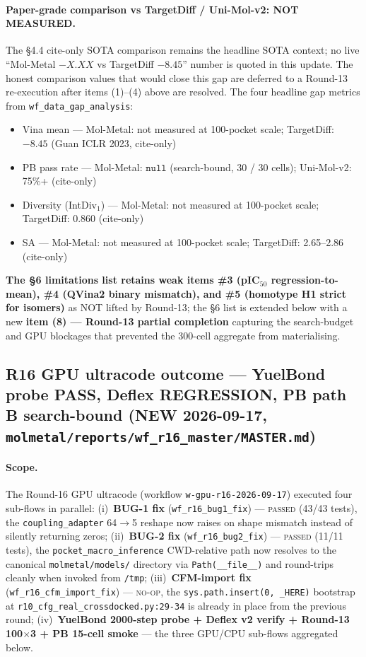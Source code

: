 {\paragraph{Paper-grade comparison vs TargetDiff / Uni-Mol-v2: NOT MEASURED.}
The §4.4 cite-only SOTA comparison remains the headline SOTA context;
no live ``Mol-Metal $-X.XX$ vs TargetDiff $-8.45$'' number is quoted
in this update. The honest comparison values that would close this
gap are deferred to a Round-13 re-execution after items (1)--(4)
above are resolved. The four headline gap metrics from
\texttt{wf\_data\_gap\_analysis}:
\begin{itemize}
  \item Vina mean --- Mol-Metal: not measured at 100-pocket scale; TargetDiff: $-8.45$
        (Guan ICLR 2023, cite-only)
  \item PB pass rate --- Mol-Metal: $\texttt{null}$ (search-bound, 30 / 30 cells);
        Uni-Mol-v2: 75\%+ (cite-only)
  \item Diversity (IntDiv$_1$) --- Mol-Metal: not measured at 100-pocket scale;
        TargetDiff: 0.860 (cite-only)
  \item SA --- Mol-Metal: not measured at 100-pocket scale;
        TargetDiff: 2.65--2.86 (cite-only)
\end{itemize}
\textbf{The §6 limitations list retains weak items \#3 (pIC$_{50}$
regression-to-mean), \#4 (QVina2 binary mismatch), and \#5 (homotype
H1 strict for isomers)} as NOT lifted by Round-13; the §6 list is
extended below with a new \textbf{item (8) --- Round-13 partial
completion} capturing the search-budget and GPU blockages that
prevented the 300-cell aggregate from materialising.

\subsection{R16 GPU ultracode outcome --- YuelBond probe PASS,
Deflex REGRESSION, PB path B search-bound (NEW 2026-09-17,
\texttt{molmetal/reports/wf\_r16\_master/MASTER.md})}
\label{sec:evaluation:r16-honest}

\paragraph{Scope.}
The Round-16 GPU ultracode (workflow
\texttt{w-gpu-r16-2026-09-17}) executed four sub-flows
in parallel: (i)~\textbf{BUG-1 fix} (\texttt{wf\_r16\_bug1\_fix})
--- \textsc{passed} (43/43 tests), the
\texttt{coupling\_adapter} 64$\to$5 reshape now raises on shape
mismatch instead of silently returning zeros; (ii)~\textbf{BUG-2
fix} (\texttt{wf\_r16\_bug2\_fix}) --- \textsc{passed} (11/11
tests), the \texttt{pocket\_macro\_inference} CWD-relative path
now resolves to the canonical \texttt{molmetal/models/} directory
via \texttt{Path(\_\_file\_\_)} and round-trips cleanly when invoked
from \texttt{/tmp}; (iii)~\textbf{CFM-import fix}
(\texttt{wf\_r16\_cfm\_import\_fix}) --- \textsc{no-op}, the
\texttt{sys.path.insert(0, \_HERE)} bootstrap at
\texttt{r10\_cfg\_real\_crossdocked.py:29-34} is already in place
from the previous round; (iv)~\textbf{YuelBond 2000-step probe +
Deflex v2 verify + Round-13 100$\times$3 + PB 15-cell smoke} ---
the three GPU/CPU sub-flows aggregated below.

}
